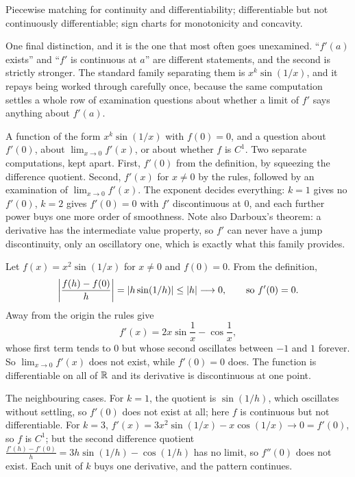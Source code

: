 \begin{seealsob}Piecewise matching for continuity and differentiability; differentiable but not continuously differentiable; sign charts for monotonicity and concavity.\end{seealsob}

One final distinction, and it is the one that most often goes unexamined. ``$f'(a)$ exists'' and ``$f'$ is continuous at $a$'' are different statements, and the second is strictly stronger. The standard family separating them is $x^{k}\sin(1/x)$, and it repays being worked through carefully once, because the same computation settles a whole row of examination questions about whether a limit of $f'$ says anything about $f'(a)$.

\cue A function of the form $x^{k}\sin(1/x)$ with $f(0)=0$, and a question about $f'(0)$, about $\lim_{x\to0}f'(x)$, or about whether $f$ is $C^{1}$.
\method Two separate computations, kept apart. First, $f'(0)$ from the definition, by squeezing the difference quotient. Second, $f'(x)$ for $x\neq0$ by the rules, followed by an examination of $\lim_{x\to0}f'(x)$. The exponent decides everything: $k=1$ gives no $f'(0)$, $k=2$ gives $f'(0)=0$ with $f'$ discontinuous at $0$, and each further power buys one more order of smoothness. Note also Darboux's theorem: a derivative has the intermediate value property, so $f'$ can never have a jump discontinuity, only an oscillatory one, which is exactly what this family provides.

\begin{worked}
Let $f(x)=x^{2}\sin(1/x)$ for $x\neq0$ and $f(0)=0$. From the definition,
\[
\left|\frac{f(h)-f(0)}{h}\right|=\left\lvert h\sin(1/h)\right\rvert\leq\left\lvert h\right\rvert\longrightarrow0 ,\qquad\text{so } f'(0)=0 .
\]
Away from the origin the rules give
\[
f'(x)=2x\sin\frac1x-\cos\frac1x ,
\]
whose first term tends to $0$ but whose second oscillates between $-1$ and $1$ forever. So $\lim_{x\to0}f'(x)$ does not exist, while $f'(0)=0$ does. The function is differentiable on all of $\mathbb{R}$ and its derivative is discontinuous at one point.

The neighbouring cases. For $k=1$, the quotient is $\sin(1/h)$, which oscillates without settling, so $f'(0)$ does not exist at all; here $f$ is continuous but not differentiable. For $k=3$, $f'(x)=3x^{2}\sin(1/x)-x\cos(1/x)\to0=f'(0)$, so $f$ is $C^{1}$; but the second difference quotient $\frac{f'(h)-f'(0)}{h}=3h\sin(1/h)-\cos(1/h)$ has no limit, so $f''(0)$ does not exist. Each unit of $k$ buys one derivative, and the pattern continues.
\end{worked}


